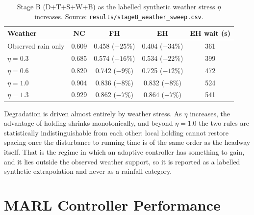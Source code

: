 \begin{table}[htbp]
\centering
\caption[Stage B weather sweep]{Stage B (D+T+S+W+B) as the labelled synthetic weather stress $\eta$
increases. Source: \texttt{results/stageB\_weather\_sweep.csv}.}
\label{tab:stage-b-sweep}
\begin{tabular}{lcccc}
\toprule
\textbf{Weather} & \textbf{NC} & \textbf{FH} & \textbf{EH} & \textbf{EH wait (s)} \\
\midrule
Observed rain only & 0.609 & 0.458 ($-25\%$) & 0.404 ($-34\%$) & 361 \\
$\eta = 0.3$       & 0.685 & 0.574 ($-16\%$) & 0.534 ($-22\%$) & 399 \\
$\eta = 0.6$       & 0.820 & 0.742 ($-9\%$)  & 0.725 ($-12\%$) & 472 \\
$\eta = 1.0$       & 0.904 & 0.836 ($-8\%$)  & 0.832 ($-8\%$)  & 524 \\
$\eta = 1.3$       & 0.929 & 0.862 ($-7\%$)  & 0.864 ($-7\%$)  & 541 \\
\bottomrule
\end{tabular}
\end{table}

Degradation is driven almost entirely by weather stress. As $\eta$ increases, the advantage of holding
shrinks monotonically, and beyond $\eta = 1.0$ the two rules are statistically indistinguishable from
each other: local holding cannot restore spacing once the disturbance to running time is of the same
order as the headway itself. That is the regime in which an adaptive controller has something to gain,
and it lies outside the observed weather support, so it is reported as a labelled synthetic
extrapolation and never as a rainfall category.

\section{MARL Controller Performance}
\label{sec:results-marl}

